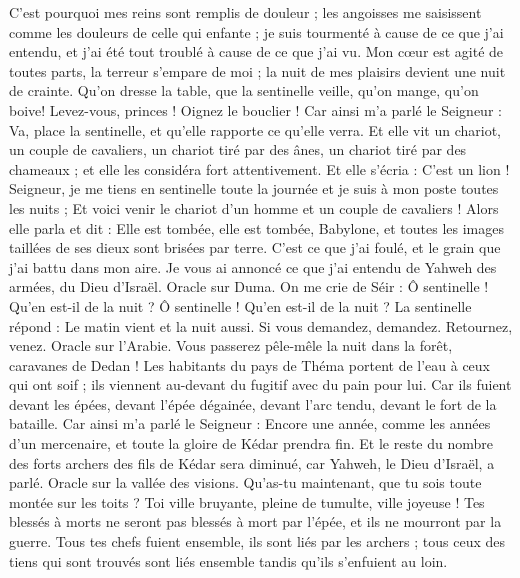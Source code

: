\begin{multicols}{2}
C'est pourquoi mes reins sont remplis de douleur ; les angoisses me saisissent comme les douleurs de celle qui enfante ; je suis tourmenté à cause de ce que j'ai entendu, et j'ai été tout troublé à cause de ce que j'ai vu.
Mon cœur est agité de toutes parts, la terreur s'empare de moi ; la nuit de mes plaisirs devient une nuit de crainte.
Qu'on dresse la table, que la sentinelle veille, qu'on mange, qu'on boive! Levez-vous, princes ! Oignez le bouclier !
Car ainsi m'a parlé le Seigneur : Va, place la sentinelle, et qu'elle rapporte ce qu'elle verra.
Et elle vit un chariot, un couple de cavaliers, un chariot tiré par des ânes, un chariot tiré par des chameaux ; et elle les considéra fort attentivement.
Et elle s'écria : C'est un lion ! Seigneur, je me tiens en sentinelle toute la journée et je suis à mon poste toutes les nuits ;
Et voici venir le chariot d'un homme et un couple de cavaliers ! Alors elle parla et dit : Elle est tombée, elle est tombée, Babylone, et toutes les images taillées de ses dieux sont brisées par terre.
C'est ce que j'ai foulé, et le grain que j'ai battu dans mon aire. Je vous ai annoncé ce que j'ai entendu de Yahweh des armées, du Dieu d'Israël.
Oracle sur Duma. On me crie de Séir : Ô sentinelle ! Qu'en est-il de la nuit ? Ô sentinelle ! Qu'en est-il de la nuit ?
La sentinelle répond : Le matin vient et la nuit aussi. Si vous demandez, demandez. Retournez, venez.
Oracle sur l'Arabie. Vous passerez pêle-mêle la nuit dans la forêt, caravanes de Dedan !
Les habitants du pays de Théma portent de l'eau à ceux qui ont soif ; ils  viennent au-devant du fugitif avec du pain pour lui.
Car ils fuient devant les épées, devant l'épée dégainée, devant l'arc tendu, devant le fort de la bataille.
Car ainsi m'a parlé le Seigneur : Encore une année, comme les années d'un mercenaire, et toute la gloire de Kédar prendra fin.
Et le reste du nombre des forts archers des fils de Kédar sera diminué, car Yahweh, le Dieu d'Israël, a parlé.
\VerseOne{}Oracle sur la vallée des visions. Qu'as-tu maintenant, que tu sois toute montée sur les toits ?
Toi ville bruyante, pleine de tumulte, ville joyeuse ! Tes blessés à morts ne seront pas blessés à mort par l'épée, et ils ne mourront par la guerre.
Tous tes chefs fuient ensemble, ils sont liés par les archers ; tous ceux des tiens qui sont trouvés sont liés ensemble tandis qu'ils s'enfuient au loin.

\end{multicols}
